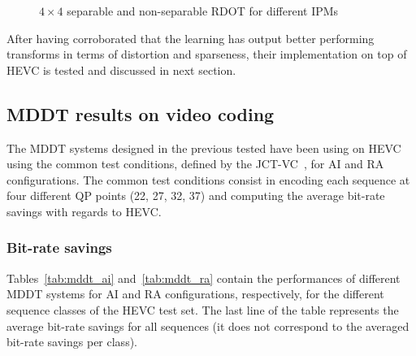 \documentclass[11pt,a4paper,openright,twoside]{book}
\numberwithin{equation}{section} %
\numberwithin{figure}{section} %
\numberwithin{table}{section} %
\begin{document}
\begin{figure}[tb]
	\hfill
	\hfill
	\hfill
	\caption{$4\times4$ separable and non-separable \acs{RDOT} for different \acsp{IPM}}
	\label{fig:rdot_4x4_bases}
\end{figure}

After having corroborated that the learning has output better performing
transforms in terms of distortion and sparseness, their implementation on top
of \ac{HEVC} is tested and discussed in next section.

\subsection{\acs{MDDT} results on video coding}
\label{sub:mddt_results_on_video_coding}

The \ac{MDDT} systems designed in the previous tested have been using on
\ac{HEVC} using the common test conditions, defined by the
\ac{JCT-VC}~\cite{bossen-12-common-test-conditions}, for \ac{AI} and \ac{RA}
configurations.
The common test conditions consist in encoding each sequence at four different
\ac{QP} points (22, 27, 32, 37) and computing the average bit-rate savings
with regards to \ac{HEVC}.

\subsubsection{Bit-rate savings}
\label{ssub:mddt_bit_rate_savings}

Tables~\ref{tab:mddt_ai} and~\ref{tab:mddt_ra} contain the performances of
different \ac{MDDT} systems for \ac{AI} and \ac{RA} configurations,
respectively, for the different sequence classes of the \ac{HEVC} test set.
The last line of the table represents the average bit-rate savings for all
sequences (it does not correspond to the averaged bit-rate savings per class).
\end{document}
